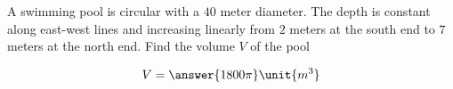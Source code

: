 \documentclass{ximera}
\author{David Guichard \and Neal Koblitz \and H. Jerome Keisler \and Albert Scheller \and Barry Balof \and Mike Wills \and Matthew Carr}
\begin{document}
\begin{exercise}




A swimming pool is circular with a $40$ meter diameter. The depth is constant along east-west lines and increasing linearly from $2$ meters at the south end to $7$ meters at the north end. Find the volume $V$ of the pool

\begin{prompt}
\[
V=\answer{1800\pi}\unit{m^3}
\]
\end{prompt}



\end{exercise}
\end{document}
